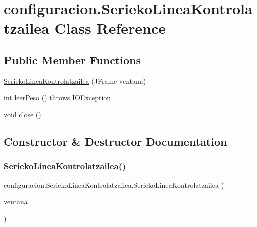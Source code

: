 \hypertarget{classconfiguracion_1_1_serieko_linea_kontrolatzailea}{}\section{configuracion.\+Serieko\+Linea\+Kontrolatzailea Class Reference}
\label{classconfiguracion_1_1_serieko_linea_kontrolatzailea}
\subsection*{Public Member Functions}
\begin{DoxyCompactItemize}
\item 
\mbox{\hyperlink{classconfiguracion_1_1_serieko_linea_kontrolatzailea_a6e98e16a8f139245d02027814458b98c}{Serieko\+Linea\+Kontrolatzailea}} (J\+Frame ventana)
\item 
int \mbox{\hyperlink{classconfiguracion_1_1_serieko_linea_kontrolatzailea_ad70433445ac917689add8ffc146ccb3c}{leer\+Peso}} ()  throws I\+O\+Exception
\item 
void \mbox{\hyperlink{classconfiguracion_1_1_serieko_linea_kontrolatzailea_a0aa74605951055d7d29b0e885019c9b9}{close}} ()
\end{DoxyCompactItemize}


\subsection{Constructor \& Destructor Documentation}
\mbox{\label{classconfiguracion_1_1_serieko_linea_kontrolatzailea_a6e98e16a8f139245d02027814458b98c}} 
\subsubsection{\texorpdfstring{Serieko\+Linea\+Kontrolatzailea()}{SeriekoLineaKontrolatzailea()}}
{\footnotesize\ttfamily configuracion.\+Serieko\+Linea\+Kontrolatzailea.\+Serieko\+Linea\+Kontrolatzailea (\begin{DoxyParamCaption}\item[{J\+Frame}]{ventana }\end{DoxyParamCaption})}



